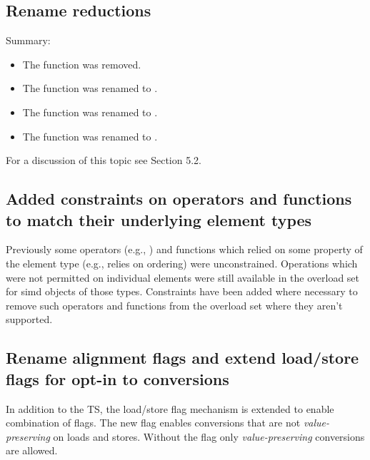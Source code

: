 \subsection{Rename  reductions}
Summary:
\begin{itemize}
  \item The function \stdx{} was removed.
  \item The function \stdx{} was renamed to \std{}.
  \item The function \stdx{} was renamed to \std{}.
  \item The function \stdx{} was renamed to \std{}.
\end{itemize}

For a discussion of this topic see  Section 5.2.

\subsection{Added constraints on operators and functions to match their underlying element types}

Previously some operators (e.g., ) and functions which relied on
some property of the element type (e.g.,  relies on ordering)
were unconstrained. Operations which were not permitted on individual elements
were still available in the overload set for simd objects of those types.
Constraints have been added where necessary to remove such operators and
functions from the overload set where they aren't supported.


\subsection{Rename alignment flags and extend load/store flags for opt-in to conversions}\label{sec:renameandextendflags}

In addition to the TS, the load/store flag mechanism is extended to enable combination of flags.
The new flag enables conversions that are not \emph{value-preserving} on loads and stores.
Without the flag only \emph{value-preserving} conversions are allowed.

